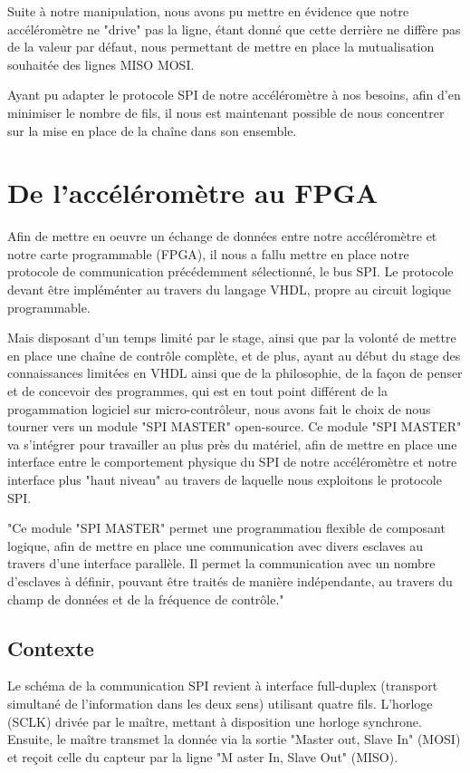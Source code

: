 \documentclass[french,a4paper,12pt]{report}
\begin{document}
	Suite à notre manipulation, nous avons pu mettre en évidence que notre accéléromètre ne "drive" pas la ligne, étant donné que cette derrière ne diffère pas de la valeur par défaut, nous permettant de mettre en place la mutualisation souhaitée des lignes MISO MOSI.
	
	Ayant pu adapter le protocole SPI de notre accéléromètre à nos besoins, afin d'en minimiser le nombre de fils, il nous est maintenant possible de nous concentrer sur la mise en place de la chaîne dans son ensemble.
	
	\chapter{De l'accéléromètre au FPGA}
	
		Afin de mettre en oeuvre un échange de données entre notre accéléromètre et notre carte programmable (FPGA), il nous a fallu mettre en place notre protocole de communication précédemment sélectionné, le bus SPI. Le protocole devant être impléménter au travers du langage VHDL, propre au circuit logique programmable.
		
		Mais disposant d'un temps limité par le stage, ainsi que par la volonté de mettre en place une chaîne de contrôle complète, et de plus, ayant au début du stage des connaissances limitées en VHDL ainsi que de la philosophie, de la façon de penser et de concevoir des programmes, qui est en tout point différent de la progammation logiciel sur micro-contrôleur, nous avons fait le choix de nous tourner vers un module "SPI MASTER" open-source.		
		Ce module "SPI MASTER" va s'intégrer pour travailler au plus près du matériel, afin de mettre en place une interface entre le comportement physique du SPI de notre accéléromètre et notre interface plus "haut niveau" au travers de laquelle nous exploitons le protocole SPI.
		
		"Ce module "SPI MASTER" permet une programmation flexible de composant logique, afin de mettre en place une communication avec divers esclaves au travers d'une interface parallèle. Il permet la communication avec un nombre d'esclaves à définir, pouvant être traités de manière indépendante, au travers du champ de données et de la fréquence de contrôle."
		
		\section{Contexte}
			Le schéma de la communication SPI revient à interface full-duplex (transport simultané de l'information dans les deux sens) utilisant quatre fils. L'horloge (SCLK) drivée par le maître, mettant à disposition une horloge synchrone. Ensuite, le maître transmet la donnée via la sortie "Master out, Slave In" (MOSI) et reçoit celle du capteur par la ligne "M	aster In, Slave Out" (MISO).
			
\end{document}
